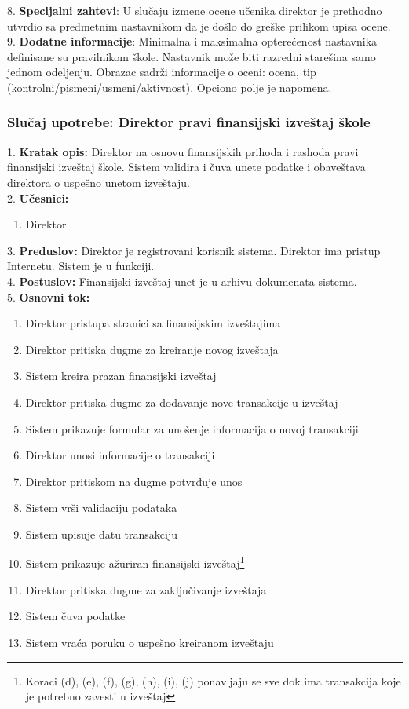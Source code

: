 \documentclass{article}
\begin{document}
8. \textbf{Specijalni zahtevi}: U slučaju izmene ocene učenika direktor je prethodno utvrdio sa predmetnim nastavnikom da je došlo do greške prilikom upisa ocene. \\

9. \textbf{Dodatne informacije}: Minimalna i maksimalna opterećenost nastavnika definisane su pravilnikom škole. Nastavnik može biti razredni starešina samo jednom odeljenju. Obrazac sadrži informacije o oceni: ocena, tip (kontrolni/pismeni/usmeni/aktivnost). Opciono polje je napomena. \\


\subsubsection{Slučaj upotrebe: Direktor pravi finansijski izveštaj škole}
1. \textbf{Kratak opis:} Direktor na osnovu finansijskih prihoda i rashoda pravi finansijski izveštaj škole. Sistem validira i čuva unete podatke i obaveštava direktora o uspešno unetom izveštaju. \\

2. \textbf{Učesnici:}
\begin{enumerate} [label=(\alph*)]
\item Direktor
\end{enumerate} 

3. \textbf{Preduslov:} Direktor je registrovani korisnik sistema. Direktor ima pristup Internetu. Sistem je u funkciji. \\

4. \textbf{Postuslov:} Finansijski izveštaj unet je u arhivu dokumenata sistema. \\

5. \textbf{Osnovni tok:} 
\begin{enumerate} [label=(\alph*)]
\item Direktor pristupa stranici sa finansijskim izveštajima
\item Direktor pritiska dugme za kreiranje novog izveštaja
\item Sistem kreira prazan finansijski izveštaj
\item Direktor pritiska dugme za dodavanje nove transakcije u izveštaj
\item Sistem prikazuje formular za unošenje informacija o novoj transakciji
\item Direktor unosi informacije o transakciji
\item Direktor pritiskom na dugme potvrđuje unos
\item Sistem vrši validaciju podataka
\item Sistem upisuje datu transakciju
\item Sistem prikazuje ažuriran finansijski izveštaj\footnote{Koraci (d), (e), (f), (g), (h), (i), (j) ponavljaju se sve dok ima transakcija koje je potrebno zavesti u izveštaj}
\item Direktor pritiska dugme za zaključivanje izveštaja
\item Sistem čuva podatke
\item Sistem vraća poruku o uspešno kreiranom izveštaju

\end{enumerate}
\end{document}
